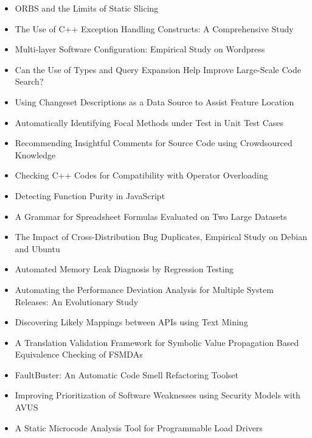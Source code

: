 {\small
\begin{itemize}[itemsep=-1ex]
  \item ORBS and the Limits of Static Slicing
  \item The Use of C++ Exception Handling Constructs: A Comprehensive Study
  \item Multi-layer Software Configuration: Empirical Study on Wordpress
  \item Can the Use of Types and Query Expansion Help Improve Large-Scale Code Search?
  \item Using Changeset Descriptions as a Data Source to Assist Feature Location
  \item Automatically Identifying Focal Methods under Test in Unit Test Cases
  \item Recommending Insightful Comments for Source Code using Crowdsourced Knowledge
  \item Checking C++ Codes for Compatibility with Operator Overloading
  \item Detecting Function Purity in JavaScript
  \item A Grammar for Spreadsheet Formulas Evaluated on Two Large Datasets
  \item The Impact of Cross-Distribution Bug Duplicates, Empirical Study on Debian and Ubuntu
  \item Automated Memory Leak Diagnosis by Regression Testing
  \item Automating the Performance Deviation Analysis for Multiple System Releases: An Evolutionary Study
  \item Discovering Likely Mappings between APIs using Text Mining
  \item A Translation Validation Framework for Symbolic Value Propagation Based Equivalence Checking of FSMDAs
  \item FaultBuster: An Automatic Code Smell Refactoring Toolset
  \item Improving Prioritization of Software Weaknesses using Security Models with AVUS
  \item A Static Microcode Analysis Tool for Programmable Load Drivers
\end{itemize}
}

